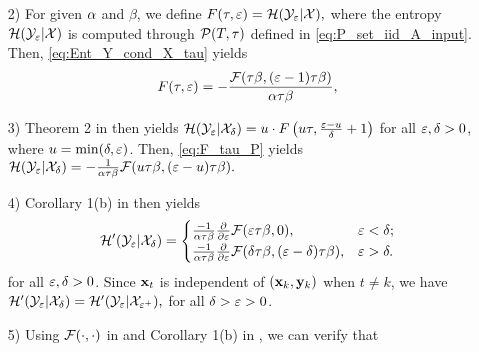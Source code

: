 \documentclass[12pt, draftclsnofoot,journal,onecolumn]{IEEEtran}
\begin{document}
\begin{itemize}
\item[2)]
For given $\alpha$ and $\beta$, we define $F(\tau,\varepsilon)=\mathcal{H}(\mathcal{Y}_\varepsilon|\mathcal{X}),$
where the entropy $\mathcal{H}(\mathcal{Y}_\varepsilon|\mathcal{X})$ is computed through  $\mathcal{P}(T,\tau)$ defined in \eqref{eq:P_set_iid_A_input}. Then, \eqref{eq:Ent_Y_cond_X_tau} yields
\begin{align}
    F(\tau,\varepsilon)=-\frac{\mathcal{F}(\tau\beta,(\varepsilon-1)\tau\beta)}{\alpha\tau\beta},
    \label{eq:F_tau_P}
\end{align}
\item[3)]
Theorem 2 in \cite{gaopart1} then yields $ \mathcal{H}(\mathcal{Y}_\varepsilon|\mathcal{X}_{\delta})=u\cdot F\left(u\tau,\frac{\varepsilon-u}{\delta}+1\right)$
for all $\varepsilon,\delta>0$, where $u=\min(\delta,\varepsilon)$.
Then, \eqref{eq:F_tau_P} yields $ \mathcal{H}(\mathcal{Y}_\varepsilon|\mathcal{X}_{\delta})=
      -\frac{1}{\alpha\tau\beta}\mathcal{F}(u\tau\beta,(\varepsilon-u)\tau\beta).$
\item[4)]
Corollary 1(b) in \cite{gaopart1} then yields
\begin{align*}
    {\mathcal{H}{'}}({\mathcal{Y}}_{\varepsilon}|{\mathcal{X}}_{\delta})=\begin{cases} 
      \frac{-1}{\alpha\tau\beta}\frac{\partial}{\partial \varepsilon}\mathcal{F}(\varepsilon\tau\beta,0), &\varepsilon< \delta; \\
      \frac{-1}{\alpha\tau\beta}\frac{\partial}{\partial \varepsilon}\mathcal{F}(\delta\tau\beta,(\varepsilon-\delta)\tau\beta), & \varepsilon> \delta.
      \end{cases}
\end{align*}
for all $\varepsilon,\delta>0$. 
Since ${\mathbf{x}}_t$ is independent of $({\mathbf{x}}_k,{\mathbf{y}}_k)$ when $t\neq k$, we have ${\mathcal{H}{'}}({\mathcal{Y}}_{\varepsilon}|{\mathcal{X}}_{\delta})={\mathcal{H}{'}}({\mathcal{Y}}_{\varepsilon}|{\mathcal{X}}_{\varepsilon^+}),$
for all $\delta>\varepsilon>0$.
\item[5)]
Using $\mathcal{F}(\cdot,\cdot)$ in \cite{wen2016bayes} and Corollary 1(b) in \cite{gaopart1}, we can verify that %

\end{itemize}
\end{document}
